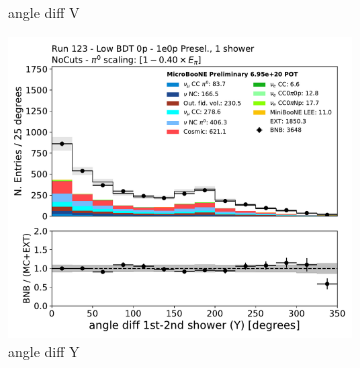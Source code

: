 \begin{figure}[H]
\begin{subfigure}{0.3\textwidth}
    \caption{angle diff V}
    \end{subfigure}
    \begin{subfigure}{0.3\textwidth}
    \includegraphics[width=1.0\textwidth]{1e0p/Low_BDT_Sideband/anglediff_Y.pdf}
    \caption{angle diff Y}
    \end{subfigure}
    \caption{} 
    \label{fig:1e0p:Low_BDT_Sideband:datamc1}
\end{figure}

